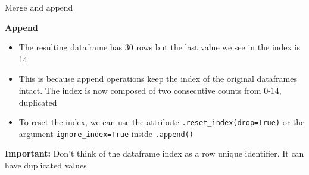 \documentclass[aspectratio=169]{beamer}
\begin{document}
\begin{frame}{Merge and append}

	\textbf{Append}

	\begin{itemize}
		\item The resulting dataframe has 30 rows but the last value we see in the index is 14
		\item This is because append operations keep the index of the original dataframes intact. The index is now composed of two consecutive counts from 0-14, duplicated
		\item To reset the index, we can use the attribute \texttt{.reset\_index(drop=True)} or the argument \texttt{ignore\_index=True} inside \texttt{.append()}
	\end{itemize}

	\textbf{Important:} Don't think of the dataframe index as a row unique identifier. It can have duplicated values

\end{frame}
\end{document}
